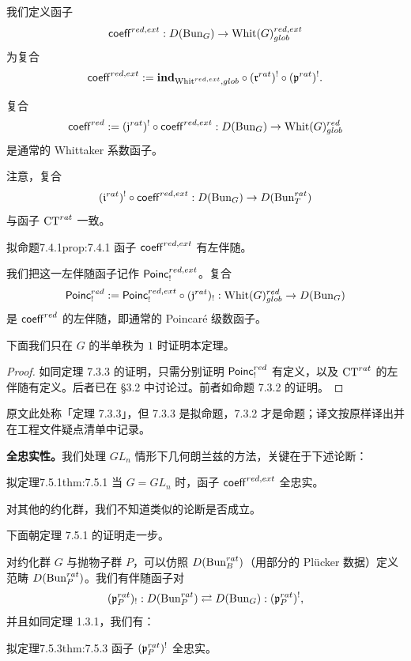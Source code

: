 我们定义函子
\[
  \mathsf{coeff}^{red,ext} : D(\operatorname{Bun}_G)\to\mathrm{Whit}(G)^{red,ext}_{glob}
\]
为复合
\[
  \mathsf{coeff}^{red,ext} := \mathbf{ind}_{\mathrm{Whit}^{red,ext},glob}\circ(\mathfrak{r}^{rat})^!\circ(\mathfrak{p}^{rat})^! .
\]

复合
\[
  \mathsf{coeff}^{red} := (\mathfrak{j}^{rat})^!\circ\mathsf{coeff}^{red,ext} : D(\operatorname{Bun}_G)\to\mathrm{Whit}(G)^{red}_{glob}
\]
是通常的 Whittaker 系数函子。

注意，复合
\[
  (\mathfrak{i}^{rat})^!\circ\mathsf{coeff}^{red,ext} : D(\operatorname{Bun}_G)\to D(\operatorname{Bun}^{rat}_T)
\]
与函子 $\mathrm{CT}^{rat}$ 一致。

\begin{othm}{拟命题}{7.4.1}{prop:7.4.1}
函子 $\mathsf{coeff}^{red,ext}$ 有左伴随。
\end{othm}

我们把这一左伴随函子记作 $\mathsf{Poinc}^{red,ext}_!$。复合
\[
  \mathsf{Poinc}^{red}_! := \mathsf{Poinc}^{red,ext}_!\circ(\mathfrak{j}^{rat})_! :
  \mathrm{Whit}(G)^{red}_{glob}\to D(\operatorname{Bun}_G)
\]
是 $\mathsf{coeff}^{red}$ 的左伴随，即通常的 Poincaré 级数函子。

下面我们只在 $G$ 的半单秩为 $1$ 时证明本定理。

\begin{proof}
如同定理 7.3.3 的证明，只需分别证明 $\mathsf{Poinc}^{red}_!$ 有定义，以及 $\mathrm{CT}^{rat}$ 的左伴随有定义。后者已在 §3.2 中讨论过。前者如命题 7.3.2 的证明。
\end{proof}

\begin{annote}
原文此处称「定理 7.3.3」，但 7.3.3 是拟命题，7.3.2 才是命题；译文按原样译出并在工程文件疑点清单中记录。\par\vspace{0.15em}{\raggedleft 【来源：原书 p.15 §7.4（A）】\par}
\end{annote}

\textbf{全忠实性。}我们处理 $GL_n$ 情形下几何朗兰兹的方法，关键在于下述论断：

\begin{othm}{拟定理}{7.5.1}{thm:7.5.1}
当 $G=GL_n$ 时，函子 $\mathsf{coeff}^{red,ext}$ 全忠实。
\end{othm}

对其他的约化群，我们不知道类似的论断是否成立。

下面朝定理 7.5.1 的证明走一步。

对约化群 $G$ 与抛物子群 $P$，可以仿照 $D(\operatorname{Bun}^{rat}_B)$（用部分的 Plücker 数据）定义范畴 $D(\operatorname{Bun}^{rat}_P)$。我们有伴随函子对
\[
  (\mathfrak{p}^{rat}_P)_! : D(\operatorname{Bun}^{rat}_P)\rightleftarrows D(\operatorname{Bun}_G) : (\mathfrak{p}^{rat}_P)^!,
\]
并且如同定理 1.3.1，我们有：

\begin{othm}{拟定理}{7.5.3}{thm:7.5.3}
函子 $(\mathfrak{p}^{rat}_P)^!$ 全忠实。
\end{othm}


